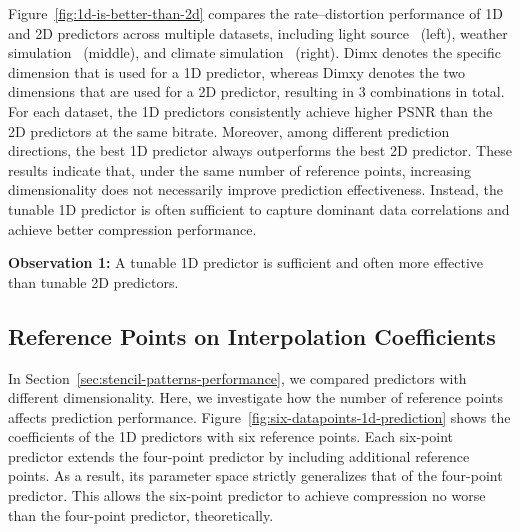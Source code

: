 Figure~\ref{fig:1d-is-better-than-2d} compares the rate–distortion performance of 1D and 2D predictors across multiple datasets, including light source~\cite{huang2025lscomp} (left), weather simulation~\cite{kossin2004mesovortices} (middle), and climate simulation~\cite{kay2015community} (right).
Dimx denotes the specific dimension that is used for a 1D predictor, whereas Dimxy denotes the two dimensions that are used for a 2D predictor, resulting in 3 combinations in total.
For each dataset, the 1D predictors consistently achieve higher PSNR than the 2D predictors at the same bitrate.
Moreover, among different prediction directions, the best 1D predictor always outperforms the best 2D predictor.
These results indicate that, under the same number of reference points, increasing dimensionality does not necessarily improve prediction effectiveness.
Instead, the tunable 1D predictor is often sufficient to capture dominant data correlations and achieve better compression performance.


\begin{boxH}
\textbf{Observation 1:}
A tunable 1D predictor is sufficient and often more effective than tunable 2D predictors.
\end{boxH}



\subsection{Reference Points on Interpolation Coefficients}


In Section~\ref{sec:stencil-patterns-performance}, we compared predictors with different dimensionality.
Here, we investigate how the number of reference points affects prediction performance.
Figure~\ref{fig:six-datapoints-1d-prediction} shows the coefficients of the 1D predictors with six reference points.
Each six-point predictor extends the four-point predictor by including additional reference points.
As a result, its parameter space strictly generalizes that of the four-point predictor.
This allows the six-point predictor to achieve compression no worse than the four-point predictor, theoretically.

